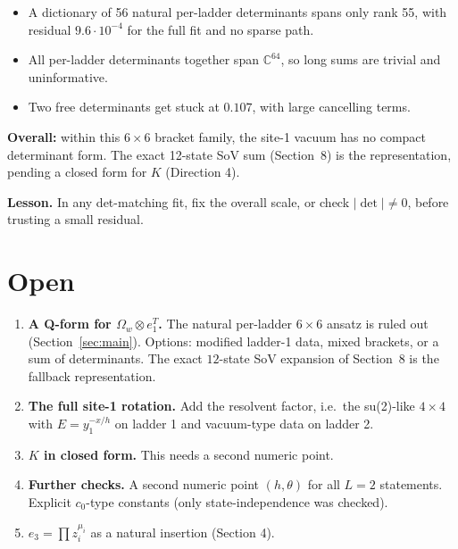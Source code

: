 \documentclass[11pt]{article}
\newcommand{\Om}{\Omega}
\begin{document}
\begin{itemize}
\begin{itemize}
\item A dictionary of 56 natural per-ladder determinants spans only rank 55, with residual $9.6\cdot10^{-4}$ for the full fit and no sparse path.
\item All per-ladder determinants together span $\mathbb C^{64}$, so long sums are trivial and uninformative.
\item Two free determinants get stuck at $0.107$, with large cancelling terms.
\end{itemize}
\textbf{Overall:} within this $6\times6$ bracket family, the site-1 vacuum has no compact determinant form. The exact 12-state SoV sum (Section~8) is the representation, pending a closed form for $K$ (Direction 4).
\end{itemize}
\textbf{Lesson.} In any det-matching fit, fix the overall scale, or check $|\det|\neq0$, before trusting a small residual.

\section{Open}
\begin{enumerate}
\item \textbf{A Q-form for $\Om_w\otimes e_1^T$.} The natural per-ladder $6\times6$ ansatz is ruled out (Section~\ref{sec:main}). Options: modified ladder-1 data, mixed brackets, or a sum of determinants. The exact $12$-state SoV expansion of Section~8 is the fallback representation.
\item \textbf{The full site-1 rotation.} Add the resolvent factor, i.e.\ the su(2)-like $4\times4$ with $E=y_1^{-x/h}$ on ladder 1 and vacuum-type data on ladder 2.
\item \textbf{$K$ in closed form.} This needs a second numeric point.
\item \textbf{Further checks.} A second numeric point $(h,\theta)$ for all $L=2$ statements. Explicit $c_0$-type constants (only state-independence was checked).
\item \textbf{$e_3=\prod z_i^{\mu_i}$} as a natural insertion (Section 4).
\end{enumerate}
\end{document}
